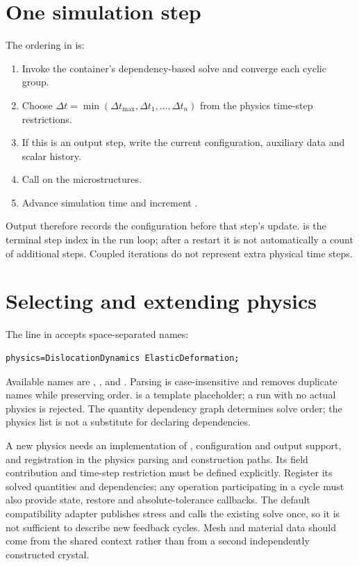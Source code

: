 \section{One simulation step}
The ordering in  is:
\begin{enumerate}
\item Invoke the container's dependency-based solve and converge each cyclic group.
\item Choose $\Delta t=\min(\Delta t_{\max},\Delta t_1,\ldots,\Delta t_n)$ from the physics time-step restrictions.
\item If this is an output step, write the current configuration, auxiliary data and scalar history.
\item Call  on the microstructures.
\item Advance simulation time and increment .
\end{enumerate}
Output therefore records the configuration before that step's update.  is the terminal step index in the run loop; after a restart it is not automatically a count of additional steps. Coupled iterations do not represent extra physical time steps.

\section{Selecting and extending physics}
The  line in  accepts space-separated names:
\par\noindent\begin{minipage}{\linewidth}
\begin{lstlisting}
physics=DislocationDynamics ElasticDeformation;
\end{lstlisting}
\end{minipage}\par
Available names are , ,  and . Parsing is case-insensitive and removes duplicate names while preserving order.  is a template placeholder; a run with no actual physics is rejected. The quantity dependency graph determines solve order; the physics list is not a substitute for declaring dependencies.

A new physics needs an implementation of , configuration and output support, and registration in the physics parsing and construction paths. Its field contribution and time-step restriction must be defined explicitly. Register its solved quantities and dependencies; any operation participating in a cycle must also provide state, restore and absolute-tolerance callbacks. The default compatibility adapter publishes stress and calls the existing solve once, so it is not sufficient to describe new feedback cycles. Mesh and material data should come from the shared context rather than from a second independently constructed crystal.
